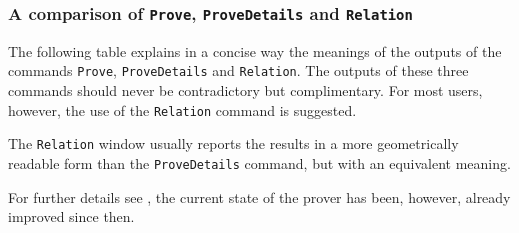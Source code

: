 \documentclass{article}
\begin{document}
\subsubsection{A comparison of \texttt{Prove}, \texttt{ProveDetails} and \texttt{Relation}}
\label{explanation-table}

The following table explains in a concise way the meanings of the outputs of the commands \texttt{Prove},
\texttt{ProveDetails} and \texttt{Relation}.
The outputs of these three commands should never be contradictory but
complimentary. For most users, however, the use of the \texttt{Relation} command is suggested.

The \texttt{Relation} window usually reports the results in a more geometrically readable form than the
\texttt{ProveDetails} command, but with an equivalent meaning.

For further details see \cite{Kovacs2015,BotanaHohenwarterJanicicKovacsPetrovicRecioWeitzhofer}, the current state of the prover has been, however, already improved since then.
\end{document}
